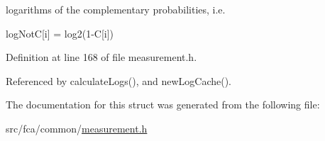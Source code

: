 logarithms of the complementary probabilities, i.\-e. 

log\-Not\-C\mbox{[}i\mbox{]} = log2(1-\/\-C\mbox{[}i\mbox{]}) 

\-Definition at line 168 of file measurement.\-h.



\-Referenced by calculate\-Logs(), and new\-Log\-Cache().



\-The documentation for this struct was generated from the following file\-:\begin{DoxyCompactItemize}
\item 
src/fca/common/\hyperlink{common_2measurement_8h}{measurement.\-h}\end{DoxyCompactItemize}
